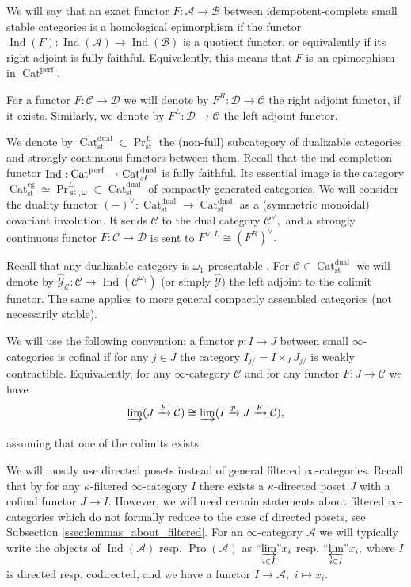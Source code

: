 \documentclass[11pt,leqno]{amsart}
\numberwithin{equation}{section}
\newcommand{\indlim}[1][]{\mathop{\varinjlim}\limits_{#1}}
\newcommand{\inddlim}[1][]{{``{\indlim[#1]}"}}
\newcommand{\prolim}[1][]{\mathop{\varprojlim}\limits_{#1}}
\newcommand{\proolim}[1][]{{``{\prolim[#1]}"}}
\newcommand{\xto}{\xrightarrow}
\newcommand{\Cat}{\operatorname{Cat}}
\newcommand{\st}{\operatorname{st}}
\newcommand{\cg}{\operatorname{cg}}
\newcommand{\dual}{\operatorname{dual}}
\newcommand{\cD}{{\mathcal D}}
\newcommand{\cA}{{\mathcal A}}
\newcommand{\cB}{{\mathcal B}}
\newcommand{\cC}{{\mathcal C}}
\newcommand{\cY}{{\mathcal Y}}
\newcommand{\perf}{\operatorname{perf}}
\newcommand{\Ind}{\operatorname{Ind}}
\newcommand{\Pro}{\operatorname{Pro}}
\begin{document}
We will say that an exact functor $F:\cA\to\cB$ between idempotent-complete small stable categories is a homological epimorphism if the functor $\Ind(F):\Ind(\cA)\to\Ind(\cB)$ is a quotient functor, or equivalently if its right adjoint is fully faithful. Equivalently, this means that $F$ is an epimorphism in $\Cat^{\perf}.$  

For a functor $F:\cC\to\cD$ we will denote by $F^R:\cD\to\cC$ the right adjoint functor, if it exists. Similarly, we denote by $F^L:\cD\to\cC$ the left adjoint functor.

We denote by $\Cat_{\st}^{\dual}\subset \Pr^L_{\st}$ the (non-full) subcategory of dualizable categories and strongly continuous functors between them. Recall that the ind-completion functor $\Ind:\Cat^{\perf}\to \Cat_{\\st}^{\dual}$ is fully faithful. Its essential image is the category $\Cat^{\cg}_{\st}\simeq \Pr^L_{\st,\omega}\subset\Cat_{\st}^{\dual}$ of compactly generated categories. We will consider the duality functor $(-)^{\vee}:\Cat_{\st}^{\dual}\to\Cat_{\st}^{\dual}$ as a (symmetric monoidal) covariant involution. It sends $\cC$ to the dual category $\cC^{\vee},$ and a strongly continuous functor $F:\cC\to\cD$ is sent to $F^{\vee,L}\cong (F^R)^{\vee}.$ 

Recall that any dualizable category is $\omega_1$-presentable \cite[Corollary 1.21]{E24}. For $\cC\in\Cat_{\st}^{\dual}$ we will denote by $\hat{\cY}_{\cC}:\cC\to\Ind(\cC^{\omega_1})$ (or simply $\hat{\cY}$) the left adjoint to the colimit functor. The same applies to more general compactly assembled categories (not necessarily stable).

We will use the following convention: a functor $p:I\to J$ between small $\infty$-categories is cofinal if for any $j\in J$ the category $I_{j/}=I\times_J J_{j/}$ is weakly contractible. Equivalently, for any $\infty$-category $\cC$ and for any functor $F:J\to\cC$ we have
\begin{equation*}
\indlim(J\xto{F}\cC)\cong \indlim(I\xto{p}J\xto{F}\cC),
\end{equation*}
assuming that one of the colimits exists.

We will mostly use directed posets instead of general filtered $\infty$-categories. Recall that by \cite[Proposition 5.3.1.18]{Lur09} for any $\kappa$-filtered $\infty$-category $I$ there exists a $\kappa$-directed poset $J$ with a cofinal functor $J\to I.$ However, we will need certain statements about filtered $\infty$-categories which do not formally reduce to the case of directed posets, see Subsection \ref{ssec:lemmas_about_filtered}. For an $\infty$-category $\cA$ we will typically write the objects of $\Ind(\cA)$ resp. $\Pro(\cA)$ as $\inddlim[i\in I]x_i$ resp. $\proolim[i\in I]x_i,$ where $I$ is directed resp. codirected, and we have a functor $I\to\cA,$ $i\mapsto x_i.$
\end{document}

